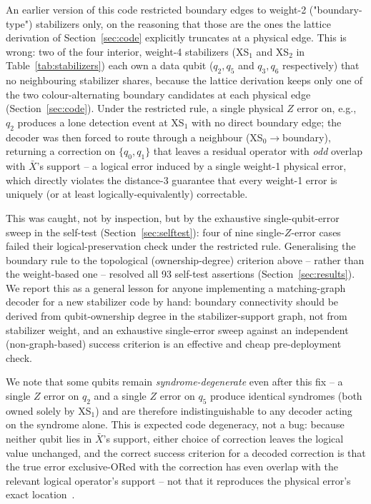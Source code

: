 \documentclass[pdflatex,sn-mathphys,Numbered]{sn-jnl}
\begin{document}
An earlier version of this code restricted boundary edges to weight-2 ("boundary-type") stabilizers only, on the reasoning that those are the ones the lattice derivation of Section~\ref{sec:code} explicitly truncates at a physical edge. This is wrong: two of the four interior, weight-4 stabilizers (XS$_1$ and XS$_2$ in Table~\ref{tab:stabilizers}) each own a data qubit ($q_2,q_5$ and $q_3,q_6$ respectively) that no neighbouring stabilizer shares, because the lattice derivation keeps only one of the two colour-alternating boundary candidates at each physical edge (Section~\ref{sec:code}). Under the restricted rule, a single physical $Z$ error on, e.g., $q_2$ produces a lone detection event at XS$_1$ with no direct boundary edge; the decoder was then forced to route through a neighbour (XS$_0\to$boundary), returning a correction on $\{q_0,q_1\}$ that leaves a residual operator with \emph{odd} overlap with $\bar X$'s support -- a logical error induced by a single weight-1 physical error, which directly violates the distance-3 guarantee that every weight-1 error is uniquely (or at least logically-equivalently) correctable.

This was caught, not by inspection, but by the exhaustive single-qubit-error sweep in the self-test (Section~\ref{sec:selftest}): four of nine single-$Z$-error cases failed their logical-preservation check under the restricted rule. Generalising the boundary rule to the topological (ownership-degree) criterion above -- rather than the weight-based one -- resolved all 93 self-test assertions (Section~\ref{sec:results}). We report this as a general lesson for anyone implementing a matching-graph decoder for a new stabilizer code by hand: boundary connectivity should be derived from qubit-ownership degree in the stabilizer-support graph, not from stabilizer weight, and an exhaustive single-error sweep against an independent (non-graph-based) success criterion is an effective and cheap pre-deployment check.

We note that some qubits remain \emph{syndrome-degenerate} even after this fix -- a single $Z$ error on $q_2$ and a single $Z$ error on $q_5$ produce identical syndromes (both owned solely by XS$_1$) and are therefore indistinguishable to any decoder acting on the syndrome alone. This is expected code degeneracy, not a bug: because neither qubit lies in $\bar X$'s support, either choice of correction leaves the logical value unchanged, and the correct success criterion for a decoded correction is that the true error exclusive-ORed with the correction has even overlap with the relevant logical operator's support -- not that it reproduces the physical error's exact location~\cite{dennis2002}.
\end{document}
